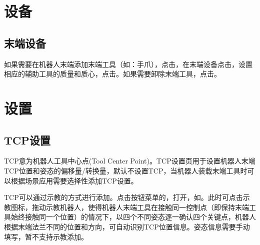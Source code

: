 \section{设备}
\subsection{末端设备}
\label{sec:末端设备}
如果需要在机器人末端添加末端工具（如：手爪），点击，在末端设备点击，设置相应的辅助工具的质量和质心，点击。如果需要卸除末端工具，点击。


\section{设置}
\subsection{TCP设置}
TCP意为机器人工具中心点(Tool Center Point)。TCP设置页用于设置机器人末端TCP位置和姿态的偏移量/转换量，默认不设置TCP，当机器人装载末端工具时可以根据场景应用需要选择性添加TCP设置。

TCP可以通过示教的方式进行添加。点击按钮菜单的，打开，如。此时可点击示教图标，拖动示教机器人，使得机器人末端工具在接触同一控制点（即保持末端工具始终接触同一个位置）的情况下，以四个不同姿态逐一确认四个关键点，机器人根据末端法兰不同的位置和方向，可自动识别TCP位置信息。姿态信息需要手动填写，暂不支持示教添加。


